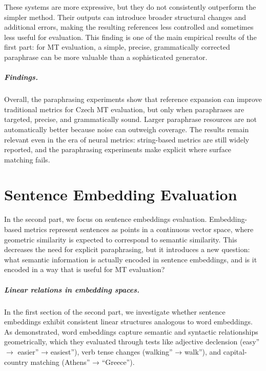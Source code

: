 \documentclass[12pt,a4paper]{report}
\begin{document}
These systems are more expressive, but they do not consistently outperform the simpler 
method. Their outputs can introduce broader structural changes and additional errors, 
making the resulting references less controlled and sometimes less useful for evaluation. 
This finding is one of the main empirical results of the first part: for MT evaluation, 
a simple, precise, grammatically corrected paraphrase can be more valuable than a 
sophisticated generator.

\paragraph{Findings.}
Overall, the paraphrasing experiments show that reference expansion can improve 
traditional metrics for Czech MT evaluation, but only when paraphrases are targeted, 
precise, and grammatically sound. Larger paraphrase resources are not automatically
better because noise can outweigh coverage. The results remain relevant even in the 
era of neural metrics: string-based metrics are still widely reported, and the 
paraphrasing experiments make explicit where surface matching fails.

\chapter{Sentence Embedding Evaluation}

In the second part, we focus on sentence embeddings evaluation. Embedding-based metrics 
represent sentences as points in a continuous vector space, where geometric similarity 
is expected to correspond to semantic similarity. This decreases the need for explicit
paraphrasing, but it introduces a new question: what semantic information is actually 
encoded in sentence embeddings, and is it encoded in a way that is useful for MT evaluation?

\paragraph{Linear relations in embedding spaces.}
In the first section of the second part, we investigate whether sentence embeddings 
exhibit consistent linear structures analogous to word embeddings. As \cite{word2vec} 
demonstrated, word embeddings capture semantic and syntactic relationships geometrically, 
which they evaluated through tests like adjective declension (easy'' $\rightarrow$ easier'' 
→ easiest''), verb tense changes (walking'' → walk''), and capital-country matching (Athens'' 
→ ``Greece'').
\end{document}
